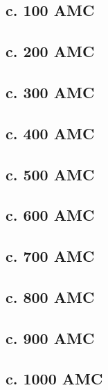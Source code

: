 \documentclass[a4paper,11pt,article,oneside]{memoir}
\begin{document}
\subsection{c. 100 AMC}

\subsection{c. 200 AMC}

\subsection{c. 300 AMC}

\subsection{c. 400 AMC}

\subsection{c. 500 AMC}

\subsection{c. 600 AMC}

\subsection{c. 700 AMC}

\subsection{c. 800 AMC}

\subsection{c. 900 AMC}

\subsection{c. 1000 AMC}
\end{document}
